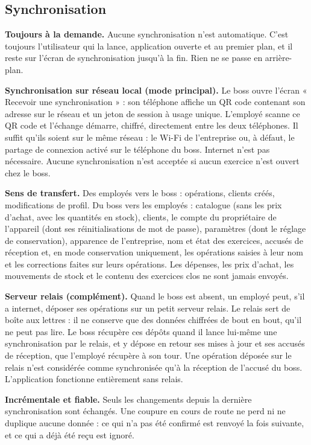\documentclass[11pt,a4paper]{article}
\newcommand{\fonc}[2]{\textbf{#1.} #2\par\vspace{0.2em}}
\begin{document}
	\subsection{Synchronisation}

	\fonc{Toujours à la demande}{Aucune synchronisation n'est automatique. C'est toujours l'utilisateur qui la lance, application ouverte et au premier plan, et il reste sur l'écran de synchronisation jusqu'à la fin. Rien ne se passe en arrière-plan.}

	\fonc{Synchronisation sur réseau local (mode principal)}{Le boss ouvre l'écran « Recevoir une synchronisation » : son téléphone affiche un QR code contenant son adresse sur le réseau et un jeton de session à usage unique. L'employé scanne ce QR code et l'échange démarre, chiffré, directement entre les deux téléphones. Il suffit qu'ils soient sur le même réseau : le Wi-Fi de l'entreprise ou, à défaut, le partage de connexion activé sur le téléphone du boss. Internet n'est pas nécessaire. Aucune synchronisation n'est acceptée si aucun exercice n'est ouvert chez le boss.}

	\fonc{Sens de transfert}{Des employés vers le boss : opérations, clients créés, modifications de profil. Du boss vers les employés : catalogue (sans les prix d'achat, avec les quantités en stock), clients, le compte du propriétaire de l'appareil (dont ses réinitialisations de mot de passe), paramètres (dont le réglage de conservation), apparence de l'entreprise, nom et état des exercices, accusés de réception et, en mode conservation uniquement, les opérations saisies à leur nom et les corrections faites sur leurs opérations. Les dépenses, les prix d'achat, les mouvements de stock et le contenu des exercices clos ne sont jamais envoyés.}

	\fonc{Serveur relais (complément)}{Quand le boss est absent, un employé peut, s'il a internet, déposer ses opérations sur un petit serveur relais. Le relais sert de boîte aux lettres : il ne conserve que des données chiffrées de bout en bout, qu'il ne peut pas lire. Le boss récupère ces dépôts quand il lance lui-même une synchronisation par le relais, et y dépose en retour ses mises à jour et ses accusés de réception, que l'employé récupère à son tour. Une opération déposée sur le relais n'est considérée comme synchronisée qu'à la réception de l'accusé du boss. L'application fonctionne entièrement sans relais.}

	\fonc{Incrémentale et fiable}{Seuls les changements depuis la dernière synchronisation sont échangés. Une coupure en cours de route ne perd ni ne duplique aucune donnée : ce qui n'a pas été confirmé est renvoyé la fois suivante, et ce qui a déjà été reçu est ignoré.}
\end{document}
